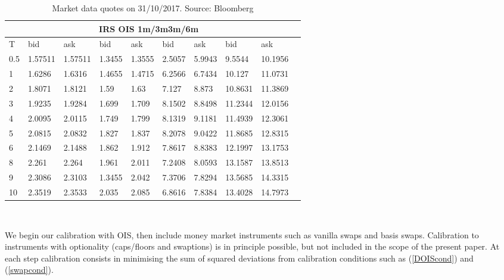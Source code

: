 \documentclass[12pt,a4paper]{article}
\theoremstyle{plain}
\numberwithin{equation}{section}
\begin{document}
\begin{table}[t]
\begin{center}
\begin{tabular}{|l|l|l|l|l|l|l|l|l|l|}

\hline
\multicolumn{9}{|c|}{IRS \;\;\;\; \;\;\;\;\;\;\;\;\;\;\;\;OIS \;\;\;\;\;\;\;\;\;\;\;\;\;\;\;\;\;1m/3m\;\;\;\;\;\;\;\;\;\;\;\;\;\;\;\;\;3m/6m} \\\hline
T& bid& ask& bid& ask& bid& ask& bid& ask\\ \hline

   0.5 & 1.57511 & 1.57511 & 1.3455 & 1.3555 & 2.5057 & 5.9943 & 9.5544 & 10.1956 \\
    1     & 1.6286 & 1.6316 & 1.4655 & 1.4715 & 6.2566 & 6.7434 & 10.127 & 11.0731 \\
    2     & 1.8071 & 1.8121 & 1.59  & 1.63  & 7.127 & 8.873 & 10.8631 & 11.3869 \\
    3     & 1.9235 & 1.9284 & 1.699 & 1.709 & 8.1502 & 8.8498 & 11.2344 & 12.0156 \\
    4     & 2.0095 & 2.0115 & 1.749 & 1.799 & 8.1319 & 9.1181 & 11.4939 & 12.3061 \\
    5     & 2.0815 & 2.0832 & 1.827 & 1.837 & 8.2078 & 9.0422 & 11.8685 & 12.8315 \\
    6     & 2.1469 & 2.1488 & 1.862 & 1.912 & 7.8617 & 8.8383 & 12.1997 & 13.1753 \\
    8     & 2.261 & 2.264 & 1.961 & 2.011 & 7.2408 & 8.0593 & 13.1587 & 13.8513 \\
    9     & 2.3086 & 2.3103 & 1.3455 & 2.042 & 7.3706 & 7.8294 & 13.5685 & 14.3315 \\
    10    & 2.3519 & 2.3533 & 2.035 & 2.085 & 6.8616 & 7.8384 & 13.4028 & 14.7973 \\
\hline
\end{tabular}\\[1ex]
\caption{Market data quotes on 31/10/2017. Source: Bloomberg }\label{Marketdata:20171031}
\end{center}
\end{table}

We begin our calibration with OIS, then include money market instruments such as vanilla swaps and basis swaps. Calibration to instruments with optionality (caps/floors and swaptions) is in principle possible, but not included in the scope of the present paper. At each step calibration consists in minimising the sum of squared deviations from calibration conditions such as (\ref{DOIScond}) and (\ref{swapcond}).
\end{document}
